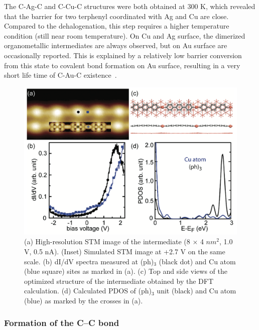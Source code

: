 \documentclass[%
 reprint,
 amsmath,amssymb,
 aps,
prb,
]{revtex4-2}
\begin{document}
The C-Ag-C and C-Cu-C structures were both obtained at 300 K, which revealed that the barrier for two terphenyl
coordinated with Ag and Cu are close. Compared to the dehalogenation, this step requires a higher temperature condition (still near room temperature). On Cu and Ag surface, the dimerized organometallic intermediates are always observed, but on Au surface are occasionally reported. This is explained by a relatively low barrier conversion from this state to covalent bond formation on Au surface, resulting in a very short life time of C-Au-C existence~\cite{ullmann_33}.
%
\begin{figure}[ht]
\centering
\includegraphics[width=0.75\columnwidth]{Fig/Organometallic.png}
\caption{(a) High-resolution STM image of the intermediate (8 $\times$ 4 $nm^2$, 1.0 V, 0.5 nA). (Inset) Simulated STM image at +2.7 V on the same scale. (b) dI/dV spectra measured at (ph)$_3$ (black dot) and Cu atom (blue square) sites as marked in (a). (c) Top and side views of the optimized structure of the intermediate obtained by the DFT calculation. (d) Calculated PDOS of (ph)$_3$ unit (black) and Cu atom (blue) as marked by the crosses in (a).}
\label{fig:organ}
\end{figure}

\subsubsection{Formation of the C--C bond}
\end{document}
